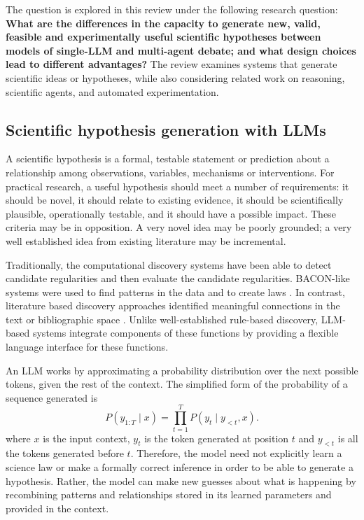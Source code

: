 \documentclass[acmsmall,screen,review]{acmart}
\begin{document}
The question is explored in this review under the following research question: \textbf{What are the differences in the capacity to generate new, valid, feasible and experimentally useful scientific hypotheses between models of single-LLM and multi-agent debate; and what design choices lead to different advantages?} The review examines systems that generate scientific ideas or hypotheses, while also considering related work on reasoning, scientific agents, and automated experimentation.


\subsection{Scientific hypothesis generation with LLMs}
\label{subsec:scientific-hypothesis-generation}
A scientific hypothesis is a formal, testable statement or prediction about a relationship among observations, variables, mechanisms or interventions. For practical research, a useful hypothesis should meet a number of requirements: it should be novel, it should relate to existing evidence, it should be scientifically plausible, operationally testable, and it should have a possible impact. These criteria may be in opposition. A very novel idea may be poorly grounded; a very well established idea from existing literature may be incremental.

Traditionally, the computational discovery systems have been able to detect candidate regularities and then evaluate the candidate regularities. BACON-like systems were used to find patterns in the data and to create laws \cite{langley1987scientific}. In contrast, literature based discovery approaches identified meaningful connections in the text or bibliographic space \cite{swanson1986undiscovered}. Unlike well-established rule-based discovery, LLM-based systems integrate components of these functions by providing a flexible language interface for these functions.

An LLM works by approximating a probability distribution over the next possible tokens, given the rest of the context. The simplified form of the probability of a sequence generated is
\begin{equation}
P\left(y_{1:T}\mid x\right)
=
\prod_{t=1}^{T}P\left(y_t\mid y_{<t},x\right).
\end{equation}
where $x$ is the input context, $y_t$ is the token generated at position $t$ and $y_{<t}$ is all the tokens generated before $t$. Therefore, the model need not explicitly learn a science law or make a formally correct inference in order to be able to generate a hypothesis. Rather, the model can make new guesses about what is happening by recombining patterns and relationships stored in its learned parameters and provided in the context.
\end{document}
